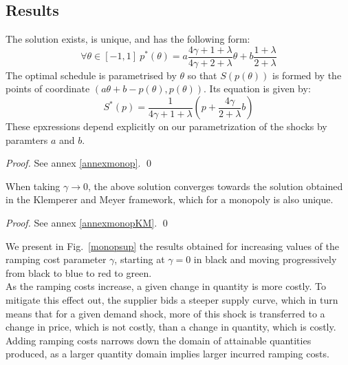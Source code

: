 \subsection{Results}
\begin{proposition}\label{monopequilibria}
The solution exists, is unique, and has the following form:
\begin{equation}
\forall \theta \in [-1,1]~p^*(\theta)=a\frac{4\gamma+1+\lambda}{4\gamma+2+\lambda}\theta+ b\frac{1+\lambda}{2+\lambda} \label{monopsol}
\end{equation}
The optimal schedule is parametrised by $\theta$ so that $S(p(\theta))$ is formed by the points of coordinate $(a\theta+b-p(\theta),p(\theta))$. Its equation is given by:
\begin{equation}
S^*(p)=\frac{1}{4\gamma+1+\lambda}\left(p+\frac{4\gamma}{2+\lambda}b\right) \label{monopS}
\end{equation}
These epxressions depend explicitly on our parametrization of the shocks by paramters $a$ and $b$.
\end{proposition}

\begin{proof}
See annex \ref{annexmonop}. \qed
\end{proof} 

\begin{proposition}\label{monopequilibriaKM}
When taking $\gamma\to 0$, the above solution converges towards the solution obtained in the Klemperer and Meyer framework, which for a monopoly is also unique.
\end{proposition}

\begin{proof}
See annex \ref{annexmonopKM}. \qed
\end{proof} 

We present in Fig.~\ref{monopsup} the results obtained for increasing values of the ramping cost parameter $\gamma$, starting at $\gamma=0$ in black and moving progressively from black to blue to red to green. \\

As the ramping costs increase, a given change in quantity is more costly. To mitigate this effect out, the supplier bids a steeper supply curve, which in turn means that for a given demand shock, more of this shock is transferred to a change in price, which is not costly, than a change in quantity, which is costly. Adding ramping costs narrows down the domain of attainable quantities produced, as a larger quantity domain implies larger incurred ramping costs.\\

